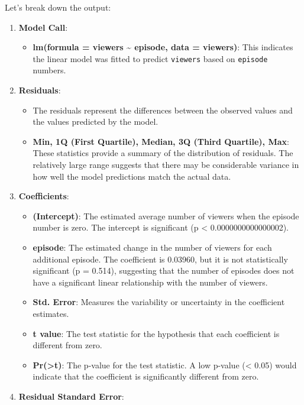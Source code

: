 \documentclass[
]{book}
\providecommand{\tightlist}{%
  \setlength{\itemsep}{0pt}\setlength{\parskip}{0pt}}
\begin{document}
Let's break down the output:

\begin{enumerate}
\def\labelenumi{\arabic{enumi}.}
\tightlist
\item
  \textbf{Model Call}:

  \begin{itemize}
  \tightlist
  \item
    \textbf{lm(formula = viewers \textasciitilde{} episode, data = viewers)}: This indicates the linear model was fitted to predict \texttt{viewers} based on \texttt{episode} numbers.
  \end{itemize}
\item
  \textbf{Residuals}:

  \begin{itemize}
  \tightlist
  \item
    The residuals represent the differences between the observed values and the values predicted by the model.
  \item
    \textbf{Min, 1Q (First Quartile), Median, 3Q (Third Quartile), Max}: These statistics provide a summary of the distribution of residuals. The relatively large range suggests that there may be considerable variance in how well the model predictions match the actual data.
  \end{itemize}
\item
  \textbf{Coefficients}:

  \begin{itemize}
  \tightlist
  \item
    \textbf{(Intercept)}: The estimated average number of viewers when the episode number is zero. The intercept is significant (p \textless{} 0.0000000000000002).
  \item
    \textbf{episode}: The estimated change in the number of viewers for each additional episode. The coefficient is 0.03960, but it is not statistically significant (p = 0.514), suggesting that the number of episodes does not have a significant linear relationship with the number of viewers.
  \item
    \textbf{Std. Error}: Measures the variability or uncertainty in the coefficient estimates.
  \item
    \textbf{t value}: The test statistic for the hypothesis that each coefficient is different from zero.
  \item
    \textbf{Pr(\textgreater\textbar t\textbar)}: The p-value for the test statistic. A low p-value (\textless{} 0.05) would indicate that the coefficient is significantly different from zero.
  \end{itemize}
\item
  \textbf{Residual Standard Error}:


\end{enumerate}
\end{document}
